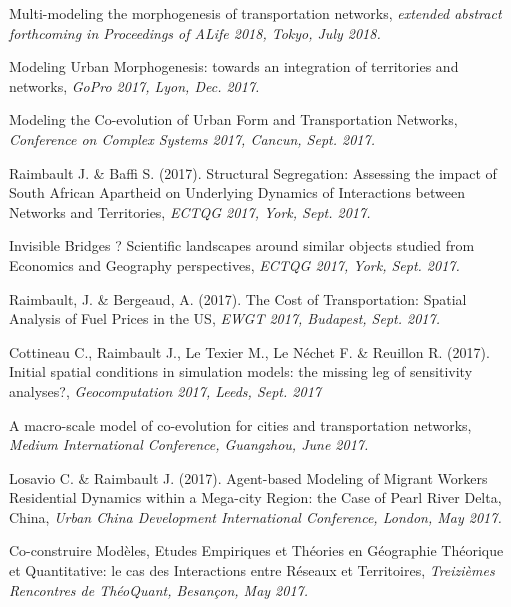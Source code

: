 
\noindent Multi-modeling the morphogenesis of transportation networks, \textit{extended abstract forthcoming in Proceedings of ALife 2018, Tokyo, July 2018.}


\bigskip



\noindent Modeling Urban Morphogenesis: towards an integration of territories and networks, \textit{GoPro 2017, Lyon, Dec. 2017.}


\bigskip


\noindent Modeling the Co-evolution of Urban Form and Transportation Networks, \textit{Conference on Complex Systems 2017, Cancun, Sept. 2017.}

\bigskip

\noindent Raimbault J. \& Baffi S. (2017). Structural Segregation: Assessing the impact of South African Apartheid on Underlying Dynamics of Interactions between Networks and Territories, \textit{ECTQG 2017, York, Sept. 2017.}


\bigskip


\noindent Invisible Bridges ? Scientific landscapes around similar objects studied from Economics and Geography perspectives, \textit{ECTQG 2017, York, Sept. 2017.}


\bigskip


\noindent Raimbault, J. \& Bergeaud, A. (2017). The Cost of Transportation: Spatial Analysis of Fuel Prices in the US, \textit{EWGT 2017, Budapest, Sept. 2017.}

\bigskip


\noindent Cottineau C., Raimbault J., Le Texier M., Le N{\'e}chet F. \& Reuillon R. (2017). Initial spatial conditions in simulation models: the missing leg of sensitivity analyses?, \textit{Geocomputation 2017, Leeds, Sept. 2017}

\bigskip


\noindent A macro-scale model of co-evolution for cities and transportation networks, \textit{Medium International Conference, Guangzhou, June 2017.}


\bigskip

\noindent Losavio C. \& Raimbault J. (2017). Agent-based Modeling of Migrant Workers Residential Dynamics within a Mega-city Region: the Case of Pearl River Delta, China, \textit{Urban China Development International Conference, London, May 2017.}


\bigskip

\noindent Co-construire Modèles, Etudes Empiriques et Théories en Géographie Théorique et Quantitative: le cas des Interactions entre Réseaux et Territoires, \textit{Treizièmes Rencontres de ThéoQuant, Besançon, May 2017.}


